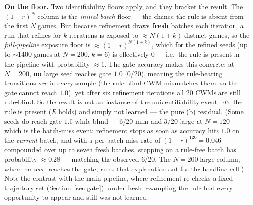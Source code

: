 \documentclass[11pt]{article}
\theoremstyle{remark}
\begin{document}
\textbf{On the floor.} Two identifiability floors apply, and they bracket the result. The $(1-r)^N$ column is the \emph{initial-batch} floor --- the chance the rule is absent from the first $N$ games. But because refinement draws \textbf{fresh} batches each iteration, a run that refines for $k$ iterations is exposed to $\approx N(1+k)$ distinct games, so the \emph{full-pipeline} exposure floor is $\approx (1-r)^{N(1+k)}$, which for the refined seeds (up to $\sim$1400 games at $N=200$, $k=6$) is effectively $0$ --- i.e.\ the rule is present in the pipeline with probability $\approx 1$. The gate accuracy makes this concrete: at $N=200$, \textbf{no} large seed reaches gate $1.0$ (0/20), meaning the rule-bearing transitions \emph{are} in every sample (the rule-blind CWM mismatches them, so the gate cannot reach $1.0$), yet after six refinement iterations all 20 CWMs are still rule-blind. So the result is not an instance of the unidentifiability event $\neg E$: the rule is present ($E$ holds) and simply not learned --- the pure (b) residual. (Some seeds do reach gate $1.0$ while blind --- 6/20 mini and 3/20 large at $N=120$ --- which is the batch-miss event: refinement stops as soon as accuracy hits $1.0$ on the \emph{current} batch, and with a per-batch miss rate of $(1-r)^{120} = 0.046$ compounded over up to seven fresh batches, stopping on a rule-free batch has probability $\approx 0.28$ --- matching the observed 6/20. The $N=200$ large column, where no seed reaches the gate, rules that explanation out for the headline cell.) Note the contrast with the main pipeline, where refinement re-checks a fixed trajectory set (Section~\ref{sec:gate}): under fresh resampling the rule had every opportunity to appear and still was not learned.
\end{document}
